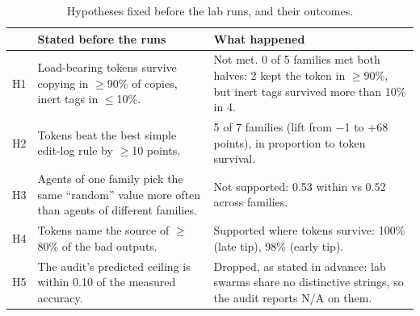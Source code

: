 \begin{table}[t]
\centering
\small
\caption{Hypotheses fixed before the lab runs, and their outcomes.}\label{tab:hyp}
\begin{tabular}{@{}lp{5.4cm}p{7.6cm}@{}}
\toprule
 & Stated before the runs & What happened \\
\midrule
H1 & Load-bearing tokens survive copying in $\geq$90\% of copies, inert tags in $\leq$10\%. & Not met. 0 of 5 families met both halves: 2 kept the token in $\geq$90\%, but inert tags survived more than 10\% in 4. \\
H2 & Tokens beat the best simple edit-log rule by $\geq$10 points. & 5 of 7 families (lift from $-$1 to +68 points), in proportion to token survival. \\
H3 & Agents of one family pick the same ``random'' value more often than agents of different families. & Not supported: 0.53 within vs 0.52 across families. \\
H4 & Tokens name the source of $\geq$80\% of the bad outputs. & Supported where tokens survive: 100\% (late tip), 98\% (early tip). \\
H5 & The audit's predicted ceiling is within 0.10 of the measured accuracy. & Dropped, as stated in advance: lab swarms share no distinctive strings, so the audit reports N/A on them. \\
\bottomrule
\end{tabular}
\end{table}